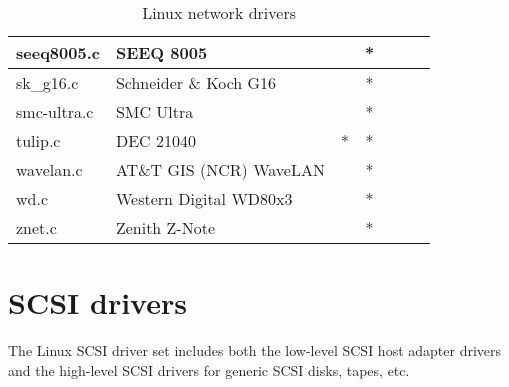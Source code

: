 \begin{table}
\begin{tabular}[c]{|l|l||c|c|c|c|c|}
seeq8005.c	& SEEQ 8005			& &*& &	&	\\\hline
sk_g16.c	& Schneider \& Koch G16		& &*& &	&	\\\hline
smc-ultra.c	& SMC Ultra			& &*& &	&	\\\hline
tulip.c		& DEC 21040			&*&*& &	&	\\\hline
wavelan.c	& AT\&T GIS (NCR) WaveLAN	& &*& &	&	\\\hline
wd.c		& Western Digital WD80x3	& &*& &	&	\\\hline
znet.c		& Zenith Z-Note			& &*& &	&	\\\hline
\end{tabular}
\label{linux-net-drivers}
\caption{Linux network drivers}
\end{table}

\section{SCSI drivers}

The Linux SCSI driver set includes
both the low-level SCSI host adapter drivers
and the high-level SCSI drivers for generic SCSI disks, tapes, etc.


